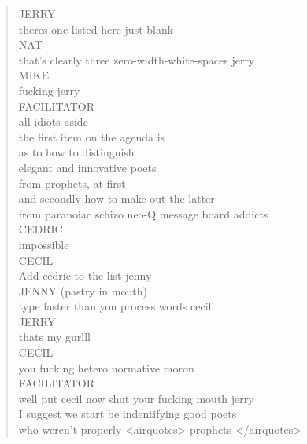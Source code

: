 \documentclass[11pt]{article}
\begin{document}
\begin{verse}
\vspace*{1em}
JERRY\\
theres one listed here just blank\\
\vspace*{1em}
NAT\\
that's clearly three zero-width-white-spaces jerry\\
\vspace*{1em}
MIKE\\
fucking jerry\\
\vspace*{1em}
FACILITATOR\\
all idiots aside\\
the first item on the agenda is\\
as to how to distinguish\\
\hspace*{2em}elegant and innovative poets\\
\hspace*{2em}from prophets, at first\\
\hspace*{2em}and secondly how to make out the latter\\
from paranoiac schizo neo-Q message board addicts\\
\vspace*{1em}
CEDRIC\\
impossible\\
\vspace*{1em}
CECIL\\
Add cedric to the list jenny\\
\vspace*{1em}
JENNY (pastry in mouth)\\
type faster than you process words cecil\\
\vspace*{1em}
JERRY\\
thats my gurlll\\
\vspace*{1em}
CECIL\\
you fucking hetero normative moron\\
\vspace*{1em}
FACILITATOR\\
well put cecil now shut your fucking mouth jerry\\
I suggest we start be indentifying good poets\\
who weren't properly <airquotes> prophets </airquotes>\\
\vspace*{1em}

\end{verse}
\end{document}
